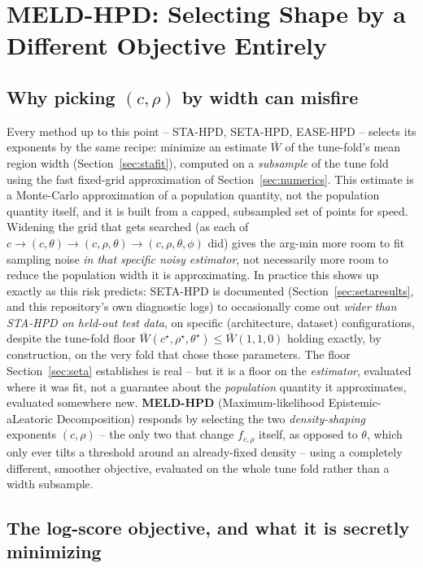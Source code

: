 \documentclass[11pt]{article}
\begin{document}
\section{MELD-HPD: Selecting Shape by a Different Objective Entirely}
\label{sec:meld}

\subsection{Why picking $(c,\rho)$ by width can misfire}

Every method up to this point -- STA-HPD, SETA-HPD, EASE-HPD -- selects its exponents by the same
recipe: minimize an estimate $\bar W$ of the tune-fold's mean region width
(Section~\ref{sec:stafit}), computed on a \emph{subsample} of the tune fold using the fast
fixed-grid approximation of Section~\ref{sec:numerics}. This estimate is a Monte-Carlo
approximation of a population quantity, not the population quantity itself, and it is built from a
capped, subsampled set of points for speed. Widening the grid that gets searched (as each of
$c\to(c,\theta)\to(c,\rho,\theta)\to(c,\rho,\theta,\phi)$ did) gives the arg-min more room to fit
sampling noise \emph{in that specific noisy estimator}, not necessarily more room to reduce the
population width it is approximating. In practice this shows up exactly as this risk predicts:
SETA-HPD is documented (Section~\ref{sec:setaresults}, and this repository's own diagnostic logs)
to occasionally come out \emph{wider than STA-HPD on held-out test data}, on specific
(architecture, dataset) configurations, despite the tune-fold floor $\bar W(c^\star,\rho^\star,
\theta^\star)\le\bar W(1,1,0)$ holding exactly, by construction, on the very fold that chose those
parameters. The floor Section~\ref{sec:seta} establishes is real -- but it is a floor on the
\emph{estimator}, evaluated where it was fit, not a guarantee about the \emph{population} quantity
it approximates, evaluated somewhere new. \textbf{MELD-HPD} (Maximum-likelihood Epistemic-aLeatoric
Decomposition) responds by selecting the two \emph{density-shaping} exponents $(c,\rho)$ --
the only two that change $f_{c,\rho}$ itself, as opposed to $\theta$, which only ever tilts a
threshold around an already-fixed density -- using a completely different, smoother objective,
evaluated on the whole tune fold rather than a width subsample.

\subsection{The log-score objective, and what it is secretly minimizing}
\end{document}
